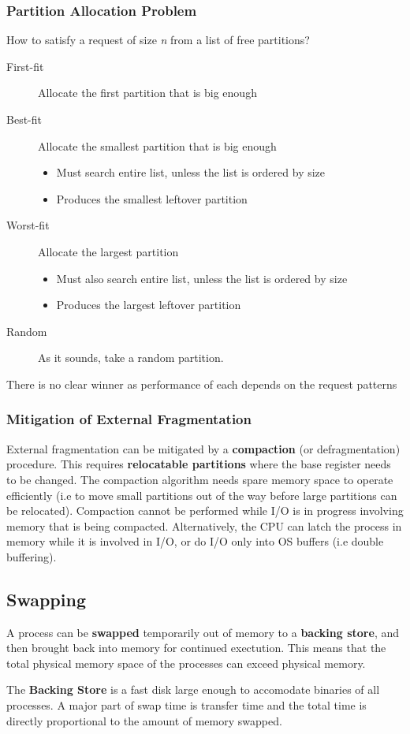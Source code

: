 \documentclass[11pt]{article}
\begin{document}
\subsubsection{Partition Allocation Problem}
\label{sec:org0d0cc34}
How to satisfy a request of size \emph{n} from a list of free partitions?
\begin{description}
\item[{First-fit}] Allocate the first partition that is big enough
\item[{Best-fit}] Allocate the smallest partition that is big enough
\begin{itemize}
\item Must search entire list, unless the list is ordered by size
\item Produces the smallest leftover partition
\end{itemize}
\item[{Worst-fit}] Allocate the largest partition
\begin{itemize}
\item Must also search entire list, unless the list is ordered by size
\item Produces the largest leftover partition
\end{itemize}
\item[{Random}] As it sounds, take a random partition.
\end{description}
There is no clear winner as performance of each depends on the request patterns

\subsubsection{Mitigation of External Fragmentation}
\label{sec:orgba7305a}
External fragmentation can be mitigated by a \textbf{compaction} (or defragmentation) procedure.
This requires \textbf{relocatable partitions} where the base register needs to be changed.
The compaction algorithm needs spare memory space to operate efficiently (i.e to move small partitions out of the way before large partitions can be relocated).
Compaction cannot be performed while I/O is in progress involving memory that is being compacted.
Alternatively, the CPU can latch the process in memory while it is involved in I/O, or do I/O only into OS buffers (i.e double buffering).
\subsection{Swapping}
\label{sec:org540993f}
A process can be \textbf{swapped} temporarily out of memory to a \textbf{backing store}, and then brought back into memory for continued exectution.
This means that the total physical memory space of the processes can exceed physical memory.

The \textbf{Backing Store} is a fast disk large enough to accomodate binaries of all processes.
A major part of swap time is transfer time and the total time is directly proportional to the amount of memory swapped.
\end{document}
